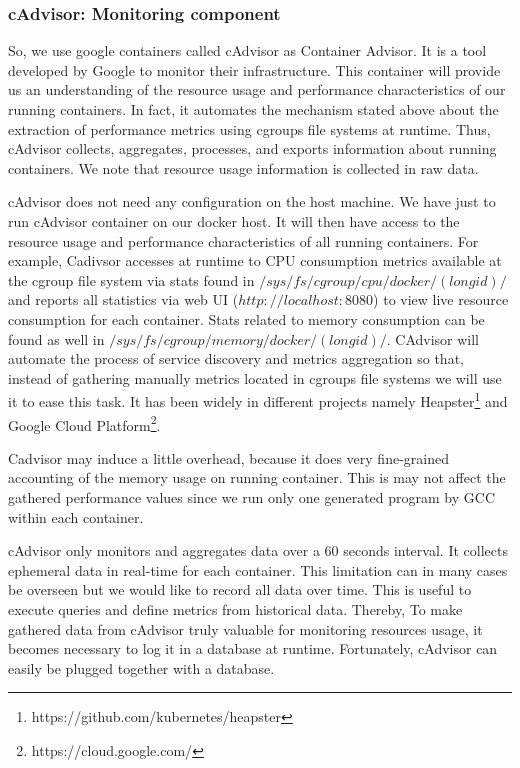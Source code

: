 \subsubsection{cAdvisor: Monitoring component}
So, we use google containers called cAdvisor as Container Advisor. It is a tool developed by Google to monitor their infrastructure. This container will provide us an understanding of the resource usage and performance characteristics of our running containers. In fact, it automates the mechanism stated above about the extraction of performance metrics using cgroups file systems at runtime. Thus, cAdvisor collects, aggregates, processes, and exports information about running containers. We note that resource usage information is collected in raw data.

cAdvisor does not need any configuration on the host machine. We have just to run cAdvisor container on our docker host. It will then have access to the resource usage and performance characteristics of all running containers. For example, Cadivsor accesses at runtime to CPU consumption metrics available at the cgroup file system via stats found in $/sys/fs/cgroup/cpu/docker/(longid)/$ and reports all statistics via web UI ($http://localhost:8080$) to view live resource consumption for each container. Stats related to memory consumption can be found as well in $/sys/fs/cgroup/memory/docker/(longid)/$. CAdvisor will automate the process of service discovery and metrics aggregation so that, instead of gathering manually metrics located in cgroups file systems we will use it to ease this task. It has been widely in different projects namely Heapster\footnote{https://github.com/kubernetes/heapster} and Google Cloud Platform\footnote{https://cloud.google.com/}.

Cadvisor may induce a little overhead, because it does very fine-grained accounting of the memory usage on running container. This is may not affect the gathered performance values since we run only one generated program by GCC within each container.

cAdvisor only monitors and aggregates data over a 60 seconds interval. It collects ephemeral data in real-time for each container. This limitation can in many cases be overseen but we would like to record all data over time. This is useful to execute queries and define metrics from historical data. Thereby, To make gathered data from cAdvisor truly valuable for monitoring resources usage, it becomes necessary to log it in a database at runtime. Fortunately, cAdvisor can easily be plugged together with a database.
